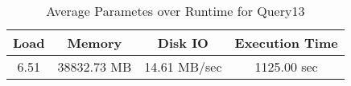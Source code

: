 \documentclass[../../main.tex]{subfiles}
\begin{document}
    \begin{table}
        \begin{center}
            \begin{tabular}{ |c|c|c|c| } 
            \hline
            Load & Memory & Disk IO & Execution Time\\
            \hline
            6.51 & 38832.73 MB & 14.61 MB/sec & 1125.00 sec \\
            \hline
            \end{tabular}
            \\[1pt]
            \caption{Average Parametes over Runtime for Query13}
        \end{center}
    \end{table}
    \pagebreak
\end{document}
